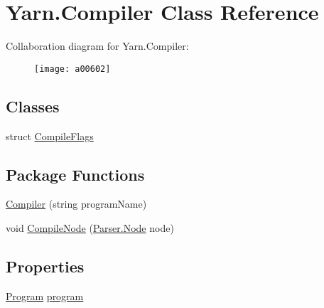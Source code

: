 \hypertarget{a00054}{\section{Yarn.\-Compiler Class Reference}
\label{a00054}
}


Collaboration diagram for Yarn.\-Compiler\-:
\nopagebreak
\begin{figure}[H]
\begin{center}
\leavevmode
\texttt{[image: a00602]}
\end{center}
\end{figure}
\subsection*{Classes}
\begin{DoxyCompactItemize}
\item 
struct \hyperlink{a00054_a00375}{Compile\-Flags}
\end{DoxyCompactItemize}
\subsection*{Package Functions}
\begin{DoxyCompactItemize}
\item 
\hyperlink{a00054_a47bfde319a618a1e11d00cb282a84364}{Compiler} (string program\-Name)
\item 
void \hyperlink{a00054_a10b52c5694f78285d087a455e3654eaa}{Compile\-Node} (\hyperlink{a00138}{Parser.\-Node} node)
\end{DoxyCompactItemize}
\subsection*{Properties}
\begin{DoxyCompactItemize}
\item 
\hyperlink{a00152}{Program} \hyperlink{a00054_aa1737da428ec7d597009661dd8a47829}{program}
\end{DoxyCompactItemize}
